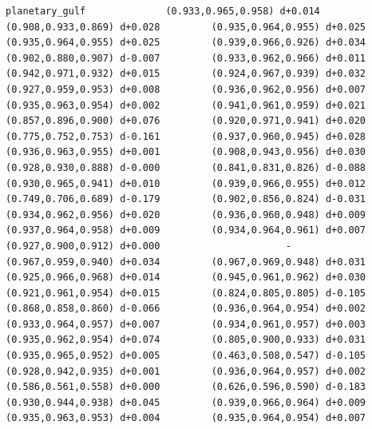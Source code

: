 \documentclass[11pt, letterpaper, openany]{book}
\begin{document}
\begin{empiricalbox}
\begin{lstlisting}[style=terminal]
planetary_gulf              (0.933,0.965,0.958) d+0.014         (0.908,0.933,0.869) d+0.028         (0.935,0.964,0.955) d+0.025         (0.935,0.964,0.955) d+0.025         (0.939,0.966,0.926) d+0.034         (0.902,0.880,0.907) d-0.007         (0.933,0.962,0.966) d+0.011         (0.942,0.971,0.932) d+0.015         (0.924,0.967,0.939) d+0.032         (0.927,0.959,0.953) d+0.008         (0.936,0.962,0.956) d+0.007         (0.935,0.963,0.954) d+0.002         (0.941,0.961,0.959) d+0.021         (0.857,0.896,0.900) d+0.076         (0.920,0.971,0.941) d+0.020         (0.775,0.752,0.753) d-0.161         (0.937,0.960,0.945) d+0.028         (0.936,0.963,0.955) d+0.001         (0.908,0.943,0.956) d+0.030         (0.928,0.930,0.888) d-0.000         (0.841,0.831,0.826) d-0.088         (0.930,0.965,0.941) d+0.010         (0.939,0.966,0.955) d+0.012         (0.749,0.706,0.689) d-0.179         (0.902,0.856,0.824) d-0.031         (0.934,0.962,0.956) d+0.020         (0.936,0.960,0.948) d+0.009         (0.937,0.964,0.958) d+0.009         (0.934,0.964,0.961) d+0.007         (0.927,0.900,0.912) d+0.000                      -                      (0.967,0.959,0.940) d+0.034         (0.967,0.969,0.948) d+0.031         (0.925,0.966,0.968) d+0.014         (0.945,0.961,0.962) d+0.030         (0.921,0.961,0.954) d+0.015         (0.824,0.805,0.805) d-0.105         (0.868,0.858,0.860) d-0.066         (0.936,0.964,0.954) d+0.002         (0.933,0.964,0.957) d+0.007         (0.934,0.961,0.957) d+0.003         (0.935,0.962,0.954) d+0.074         (0.805,0.900,0.933) d+0.031         (0.935,0.965,0.952) d+0.005         (0.463,0.508,0.547) d-0.105         (0.928,0.942,0.935) d+0.001         (0.936,0.964,0.957) d+0.002         (0.586,0.561,0.558) d+0.000         (0.626,0.596,0.590) d-0.183         (0.930,0.944,0.938) d+0.045         (0.939,0.966,0.964) d+0.009         (0.935,0.963,0.953) d+0.004         (0.935,0.964,0.954) d+0.007     

\end{lstlisting}
\end{empiricalbox}
\end{document}

